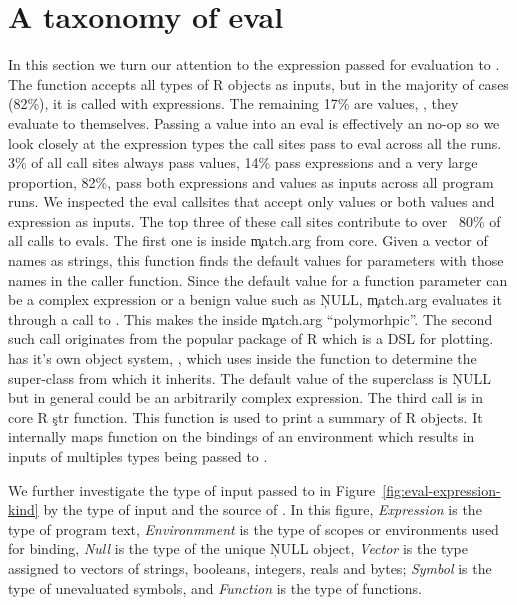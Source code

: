 \documentclass[conference]{IEEEtran}
\newcommand{\AllValueInputEvalCallPerc}{17\%\xspace}
\newcommand{\AllExpressionInputEvalCallPerc}{82\%\xspace}
\newcommand{\AllExpressionInputEvalSitePerc}{14\%\xspace}
\newcommand{\AllValueInputEvalSitePerc}{3\%\xspace}
\newcommand{\AllPolymorphicInputEvalSitePerc}{82\%\xspace}
\begin{document}
\section{A taxonomy of eval}

In this section we turn our attention to the expression passed for
evaluation to \eval. The \eval function accepts all types of R objects as
inputs, but in the majority of cases (\AllExpressionInputEvalCallPerc), it
is called with expressions. The remaining \AllValueInputEvalCallPerc are
values, \ie, they evaluate to themselves.
%
Passing a value into an eval is effectively an no-op so we look closely at
the expression types the call sites pass to eval across all the runs.
\AllValueInputEvalSitePerc of all call sites always pass values,
\AllExpressionInputEvalSitePerc pass expressions and a very large
proportion, \AllPolymorphicInputEvalSitePerc, pass both expressions and
values as inputs across all program runs. We inspected the eval callsites
that accept only values or both values and expression as inputs. The top
three of these call sites contribute to over ~80\% of all calls to
evals. The first one is inside \c{match.arg} from core. Given a vector of
names as strings, this function finds the default values for parameters with
those names in the caller function. Since the default value for a function
parameter can be a complex expression or a benign value such as \c{NULL},
\c{match.arg} evaluates it through a call to \eval. This makes the \eval
inside \c{match.arg} ``polymorhpic''. The second such \eval call originates
from the popular \ggplot package of R which is a DSL for plotting. \ggplot
has it's own object system, \ggproto, which uses \eval inside the \ggproto
function to determine the super-class from which it inherits. The default
value of the superclass is \c{NULL} but in general could be an arbitrarily
complex expression. The third \eval call is in core R \c{str} function. This
function is used to print a summary of R objects. It internally maps \eval
function on the bindings of an environment which results in inputs of
multiples types being passed to \eval.

We further investigate the type of input passed to \eval in
Figure~\ref{fig:eval-expression-kind} by the type of input and the source of
\eval. In this figure, \emph{Expression} is the type of program text,
\emph{Environmment} is the type of scopes or environments used for binding,
\emph{Null} is the type of the unique \c{NULL} object, \emph{Vector} is the
type assigned to vectors of strings, booleans, integers, reals and bytes;
\emph{Symbol} is the type of unevaluated symbols, and \emph{Function} is the
type of functions.
\end{document}
